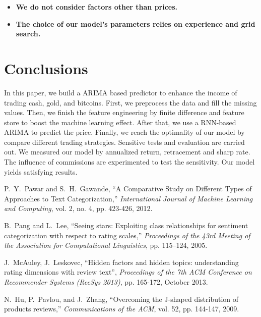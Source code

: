 \documentclass[12pt,a4paper]{article}
\newcommand{\Predictor}{ARIMA }
\begin{document}
\begin{spacing}{1.2}
\begin{itemize}
\item \textbf{We do not consider factors other than prices.}

\item \textbf{The choice of our model's parameters relies on experience and grid search.}
\end{itemize}


\section{Conclusions}
\label{Conclusions}

In this paper, we build a \Predictor based predictor to enhance the income of trading cash, gold, and bitcoins. First, we preprocess the data and fill the missing values. Then, we finish the feature engineering by finite difference and feature store to boost the machine learning effect. After that, we use a RNN-based \Predictor to predict the price. Finally, we reach the optimality of our model by compare different trading strategies. Sensitive tests and evaluation are carried out. We measured our model by annualized return, retracement and sharp rate. The influence of commissions are experimented to test the sensitivity. Our model yields satisfying results.




\newpage
\begin{thebibliography}{00}


P.~Y.~Pawar and S.~H.~Gawande, ``A Comparative Study on Different Types of Approaches to Text Categorization,'' \textit{International Journal of Machine Learning and Computing}, vol. 2, no. 4, pp. 423-426, 2012.

B.~Pang and L.~Lee, ``Seeing stars: Exploiting class relationships for sentiment categorization with respect to rating scales,'' \textit{Proceedings of the 43rd Meeting of the Association for Computational Linguistics}, pp. 115–124, 2005.

J.~McAuley, J.~Leskovec, ``Hidden factors and hidden topics: understanding rating dimensions with review text'', \textit{Proceedings of the 7th ACM Conference on Recommender Systems (RecSys 2013)}, pp. 165-172, October 2013.

N.~Hu, P.~Pavlou, and J.~Zhang, ``Overcoming the J-shaped distribution of products reviews,'' \textit{Communications of the ACM}, vol. 52, pp. 144-147, 2009. 


\end{thebibliography}
\end{spacing}
\end{document}
